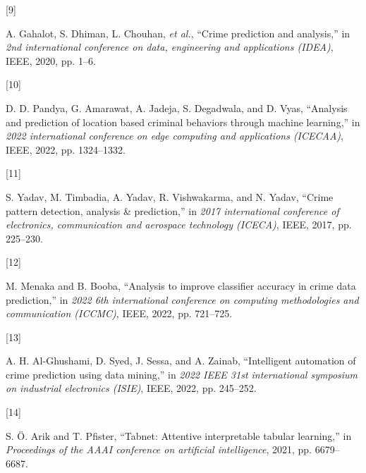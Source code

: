 \documentclass[10 pt,conference,final,]{IEEEtran}
\newlength{\cslhangindent}
\newlength{\csllabelwidth}
\newenvironment{CSLReferences}[2] %
 {\begin{list}{}{%
  \setlength{\itemindent}{0pt}
  \setlength{\leftmargin}{0pt}
  \setlength{\parsep}{0pt}
  \ifodd #1
   \setlength{\leftmargin}{\cslhangindent}
   \setlength{\itemindent}{-1\cslhangindent}
  \fi
  \setlength{\itemsep}{#2\baselineskip}}}
 {\end{list}}
\newcommand{\CSLLeftMargin}[1]{\parbox[t]{\csllabelwidth}{#1}}
\newcommand{\CSLRightInline}[1]{\parbox[t]{\linewidth - \csllabelwidth}{#1}\break}
\begin{document}
\begin{CSLReferences}{0}{0}
\CSLLeftMargin{{[}9{]} }%
\CSLRightInline{A. Gahalot, S. Dhiman, L. Chouhan, \emph{et al.},
{``Crime prediction and analysis,''} in \emph{2nd international
conference on data, engineering and applications (IDEA)}, IEEE, 2020,
pp. 1--6.}

\CSLLeftMargin{{[}10{]} }%
\CSLRightInline{D. D. Pandya, G. Amarawat, A. Jadeja, S. Degadwala, and
D. Vyas, {``Analysis and prediction of location based criminal behaviors
through machine learning,''} in \emph{2022 international conference on
edge computing and applications (ICECAA)}, IEEE, 2022, pp. 1324--1332.}

\CSLLeftMargin{{[}11{]} }%
\CSLRightInline{S. Yadav, M. Timbadia, A. Yadav, R. Vishwakarma, and N.
Yadav, {``Crime pattern detection, analysis \& prediction,''} in
\emph{2017 international conference of electronics, communication and
aerospace technology (ICECA)}, IEEE, 2017, pp. 225--230.}

\CSLLeftMargin{{[}12{]} }%
\CSLRightInline{M. Menaka and B. Booba, {``Analysis to improve
classifier accuracy in crime data prediction,''} in \emph{2022 6th
international conference on computing methodologies and communication
(ICCMC)}, IEEE, 2022, pp. 721--725.}

\CSLLeftMargin{{[}13{]} }%
\CSLRightInline{A. H. Al-Ghushami, D. Syed, J. Sessa, and A. Zainab,
{``Intelligent automation of crime prediction using data mining,''} in
\emph{2022 IEEE 31st international symposium on industrial electronics
(ISIE)}, IEEE, 2022, pp. 245--252.}

\CSLLeftMargin{{[}14{]} }%
\CSLRightInline{S. Ö. Arik and T. Pfister, {``Tabnet: Attentive
interpretable tabular learning,''} in \emph{Proceedings of the AAAI
conference on artificial intelligence}, 2021, pp. 6679--6687.}

\end{CSLReferences}
\end{document}
